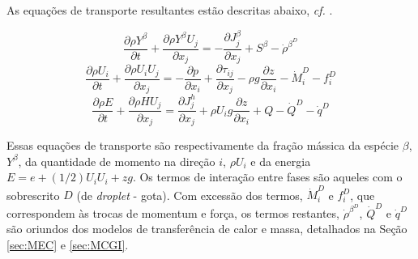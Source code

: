 
As equações de transporte resultantes estão descritas abaixo, \emph{cf.} \cite{JennyB2012}.

\begin{equation}
    \frac{\partial \rho Y^\beta}{\partial t} + 
    \frac{\partial \rho Y^\beta U_j}{\partial x_j} =
    - \frac{\partial J_j^\beta}{\partial x_j} +
    S^\beta -
    \dot \rho^{\beta^D}
\end{equation}
\begin{equation}
    \frac{\partial \rho U_i}{\partial t} + 
    \frac{\partial \rho U_i U_j}{\partial x_j} =
    - \frac{\partial p}{\partial x_i} +
    \frac{\partial \tau_{ij}}{\partial x_j} -
    \rho g\frac{\partial z}{\partial x_i} -
    \dot M_i^D -
    f_i^D
\end{equation}
\begin{equation}
    \frac{\partial \rho E}{\partial t} + 
    \frac{\partial \rho H U_j}{\partial x_j} =
    \frac{\partial J_j^h}{\partial x_j} +
    \rho U_i g \frac{\partial z}{\partial x_i} +
    Q -
    \dot Q^D -
    \dot q^D
\end{equation}

Essas equações de transporte são respectivamente da fração mássica da espécie $\beta$, $Y^\beta$, da quantidade de momento na direção $i$, $\rho U_i$ e da energia $E=e+(1/2)U_iU_i+zg$. 
Os termos de interação entre fases são aqueles com o sobrescrito $D$ (de \emph{droplet} - gota).
Com excessão dos termos, $\dot M_i^D$ e $f_i^D$, que correspondem às trocas de momentum e força, os termos restantes, $\dot \rho^{\beta^D}$, $\dot Q^D$ e $\dot q^D$ são oriundos dos modelos de transferência de calor e massa, detalhados na Seção \ref{sec:MEC} e \ref{sec:MCGI}. 

